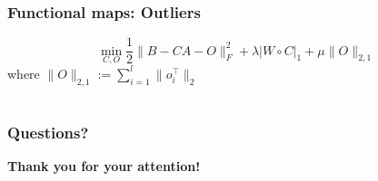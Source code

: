 \documentclass[compress]{beamer}
\begin{document}
\begin{frame}[fragile]
\begin{figure}[htp]
\begin{center}
  \end{center}
\end{figure}
\end{frame}

\begin{frame}[fragile]
\frametitle{Functional maps: Outliers}
$$
	\min_{C,O} \frac{1}{2} \| B - CA -O \|_F^2 + \lambda |W \circ C|_1 + \mu \|O\|_{2,1}
$$
where $\|O\|_{2,1}:= \sum_{i=1}^l \|o_i^\top \|_2$
\end{frame}

\section*{}

\begin{frame}
\frametitle{Questions?}
\bf{Thank you for your attention!}
\end{frame}
\end{document}
